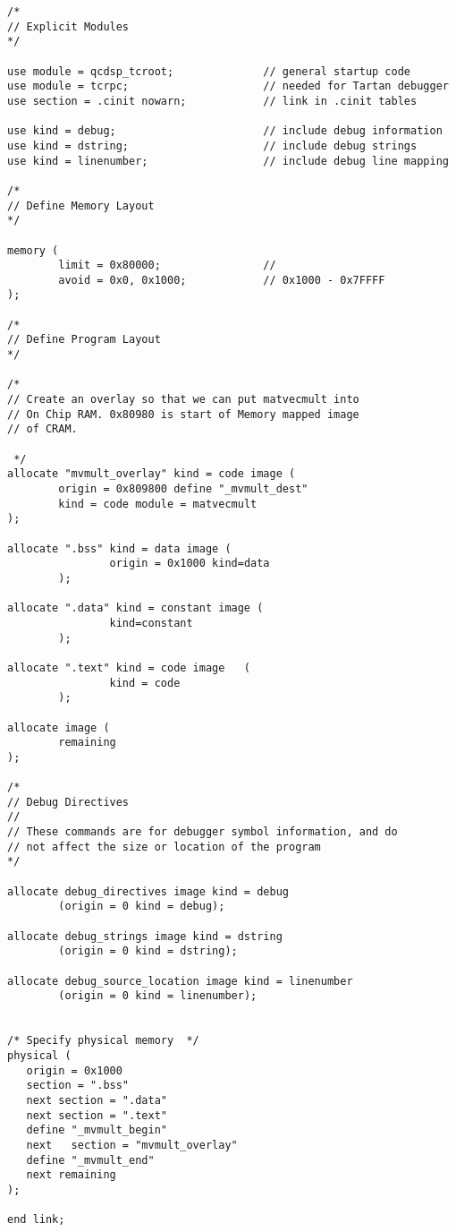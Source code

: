 {\begin{verbatim}
/*
// Explicit Modules
*/

use module = qcdsp_tcroot;              // general startup code
use module = tcrpc;                     // needed for Tartan debugger
use section = .cinit nowarn;            // link in .cinit tables

use kind = debug;                       // include debug information
use kind = dstring;                     // include debug strings
use kind = linenumber;                  // include debug line mapping

/*
// Define Memory Layout
*/

memory (
        limit = 0x80000;                //
        avoid = 0x0, 0x1000;            // 0x1000 - 0x7FFFF
);
 
/*
// Define Program Layout
*/

/*
// Create an overlay so that we can put matvecmult into
// On Chip RAM. 0x80980 is start of Memory mapped image
// of CRAM.

 */
allocate "mvmult_overlay" kind = code image (
        origin = 0x809800 define "_mvmult_dest"
        kind = code module = matvecmult
);

allocate ".bss" kind = data image (
                origin = 0x1000 kind=data
        );

allocate ".data" kind = constant image (
                kind=constant
        );

allocate ".text" kind = code image   (
                kind = code 
        );

allocate image (
        remaining
);

/*
// Debug Directives
//
// These commands are for debugger symbol information, and do
// not affect the size or location of the program
*/

allocate debug_directives image kind = debug
        (origin = 0 kind = debug);

allocate debug_strings image kind = dstring
        (origin = 0 kind = dstring);

allocate debug_source_location image kind = linenumber
        (origin = 0 kind = linenumber);


/* Specify physical memory  */
physical ( 
   origin = 0x1000
   section = ".bss"
   next section = ".data"
   next section = ".text"
   define "_mvmult_begin"
   next   section = "mvmult_overlay"
   define "_mvmult_end"
   next remaining
);

end link;
\end{verbatim}}

